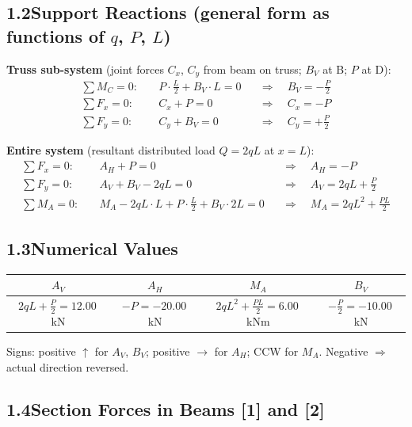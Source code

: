 \documentclass[a4paper,11pt]{article}
\begin{document}
\subsection*{1.2\quad Support Reactions (general form as functions of $q$, $P$, $L$)}

\textbf{Truss sub-system}
(joint forces $C_x$, $C_y$ from beam on truss; $B_V$ at B; $P$ at D):
\begin{align*}
  \sum M_C = 0:\quad & P \cdot \tfrac{L}{2} + B_V \cdot L = 0
    &&\Rightarrow\quad \boxed{B_V = -\tfrac{P}{2}} \\
  \sum F_x = 0:\quad & C_x + P = 0
    &&\Rightarrow\quad C_x = -P \\
  \sum F_y = 0:\quad & C_y + B_V = 0
    &&\Rightarrow\quad C_y = +\tfrac{P}{2}
\end{align*}

\textbf{Entire system} (resultant distributed load $Q = 2qL$ at $x = L$):
\begin{align*}
  \sum F_x = 0:\quad & A_H + P = 0
    &&\Rightarrow\quad \boxed{A_H = -P} \\
  \sum F_y = 0:\quad & A_V + B_V - 2qL = 0
    &&\Rightarrow\quad \boxed{A_V = 2qL + \tfrac{P}{2}} \\
  \sum M_A = 0:\quad & M_A - 2qL \cdot L + P\cdot\tfrac{L}{2} + B_V \cdot 2L = 0
    &&\Rightarrow\quad \boxed{M_A = 2qL^2 + \tfrac{PL}{2}}
\end{align*}

\subsection*{1.3\quad Numerical Values}

\begin{center}
\begin{tabular}{cccc}
\toprule
$A_V$ & $A_H$ & $M_A$ & $B_V$ \\
\midrule
$2qL + \tfrac{P}{2} = \mathbf{12.00}$\,kN
& $-P = \mathbf{-20.00}$\,kN
& $2qL^2 + \tfrac{PL}{2} = \mathbf{6.00}$\,kNm
& $-\tfrac{P}{2} = \mathbf{-10.00}$\,kN \\
\bottomrule
\end{tabular}
\end{center}

Signs: positive $\uparrow$ for $A_V$, $B_V$; positive $\rightarrow$ for $A_H$;
CCW for $M_A$. Negative $\Rightarrow$ actual direction reversed.

\subsection*{1.4\quad Section Forces in Beams [1] and [2]}
\end{document}
